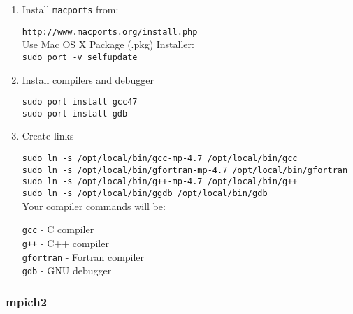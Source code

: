 \documentclass[a4paper,11pt]{article}
\begin{document}
\begin{enumerate}
\item Install \texttt{macports} from:

\indent \texttt{http://www.macports.org/install.php}\\

Use Mac OS X Package (.pkg) Installer:\\
\indent \texttt{sudo port -v selfupdate}
   
\item Install compilers and debugger

\indent \texttt{sudo port install gcc47}\\
\indent \texttt{sudo port install gdb}

\item Create links
   
\indent \texttt{sudo ln -s /opt/local/bin/gcc-mp-4.7 /opt/local/bin/gcc}\\
\indent \texttt{sudo ln -s /opt/local/bin/gfortran-mp-4.7 /opt/local/bin/gfortran}\\
\indent \texttt{sudo ln -s /opt/local/bin/g++-mp-4.7 /opt/local/bin/g++} \\ 
\indent \texttt{sudo ln -s /opt/local/bin/ggdb /opt/local/bin/gdb}\\
   
Your compiler commands will be: 

\indent \texttt{gcc}      - C compiler\\
\indent \texttt{g++}      - C++ compiler\\
\indent \texttt{gfortran} - Fortran compiler\\ 
\indent \texttt{gdb}      - GNU debugger

\end{enumerate}

\subsubsection{mpich2}
\end{document}
